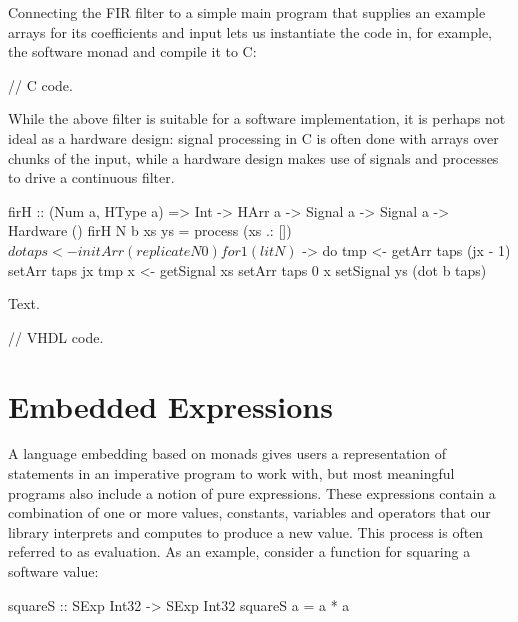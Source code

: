 \documentclass[../main.tex]{subfiles}
\begin{document}
Connecting the FIR filter to a simple main program that supplies an example arrays for its coefficients and input lets us instantiate the code in, for example, the software monad and compile it to C:

\begin{code}
// C code.
\end{code}

While the above filter is suitable for a software implementation, it is perhaps not ideal as a hardware design: signal processing in C is often done with arrays over chunks of the input, while a hardware design makes use of signals and processes to drive a continuous filter.

\begin{code}
firH :: (Num a, HType a) => Int -> HArr a -> Signal a -> Signal a
     -> Hardware ()
firH N b xs ys = process (xs .: []) $ do
  taps <- initArr (replicate N 0)
  for 1 (lit N) $ \jx -> do
    tmp <- getArr taps (jx - 1)
    setArr taps jx tmp
  x <- getSignal xs
  setArr taps 0 x
  setSignal ys (dot b taps)
\end{code}

Text.

\begin{code}
// VHDL code.
\end{code}

\section{Embedded Expressions}
\label{expr}

A language embedding based on monads gives users a representation of statements in an imperative program to work with, but most meaningful programs also include a notion of pure expressions. These expressions contain a combination of one or more values, constants, variables and operators that our library interprets and computes to produce a new value. This process is often referred to as evaluation. As an example, consider a function for squaring a software value:

\begin{code}
squareS :: SExp Int32 -> SExp Int32
squareS a = a * a
\end{code}

\end{document}
